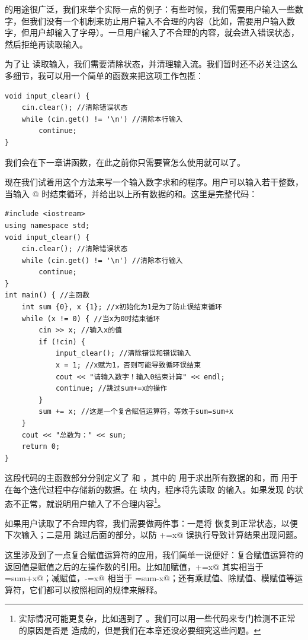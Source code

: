 \lstinline@continue@ 的用途很广泛，我们来举个实际一点的例子：有些时候，我们需要用户输入一些数字，但我们没有一个机制来防止用户输入不合理的内容（比如，需要用户输入数字，但用户却输入了字母）。一旦用户输入了不合理的内容，\lstinline@cin@ 就会进入错误状态，然后拒绝再读取输入。\par
为了让 \lstinline@cin@ 读取输入，我们需要清除状态，并清理输入流。我们暂时还不必关注这么多细节，我可以用一个简单的函数来把这项工作包揽：
\begin{lstlisting}
void input_clear() {
    cin.clear(); //清除错误状态
    while (cin.get() != '\n') //清除本行输入
        continue;
}
\end{lstlisting}
我们会在下一章讲函数，在此之前你只需要管怎么使用就可以了。\par
现在我们试着用这个方法来写一个输入数字求和的程序。用户可以输入若干整数，当输入 @ 时结束循环，并给出以上所有数据的和。这里是完整代码：
\begin{lstlisting}[caption=\texttt{sum.cpp},label=lst:SumWithContinue]
#include <iostream>
using namespace std;
void input_clear() {
    cin.clear(); //清除错误状态
    while (cin.get() != '\n') //清除本行输入
        continue;
}
int main() { //主函数
    int sum {0}, x {1}; //x初始化为1是为了防止误结束循环
    while (x != 0) { //当x为0时结束循环
        cin >> x; //输入x的值
        if (!cin) {
            input_clear(); //清除错误和错误输入
            x = 1; //x赋为1，否则可能导致循环误结束
            cout << "请输入数字！输入0结束计算" << endl;
            continue; //跳过sum+=x的操作
        }
        sum += x; //这是一个复合赋值运算符，等效于sum=sum+x
    }
    cout << "总数为：" << sum;
    return 0;
}
\end{lstlisting}
这段代码的主函数部分分别定义了 \lstinline@sum@ 和 \lstinline@x@，其中的 \lstinline@sum@ 用于求出所有数据的和，而 \lstinline@x@ 用于在每个迭代过程中存储新的数据。在 \lstinline@while@ 块内，程序将先读取 \lstinline@x@ 的输入。如果发现 \lstinline@cin@ 的状态不正常，就说明用户输入了不合理内容\footnote{实际情况可能更复杂，比如遇到了 \lstinline@EOF@。我们可以用一些代码来专门检测不正常的原因是否是 \lstinline@EOF@ 造成的，但是我们在本章还没必要细究这些问题。}。\par
如果用户读取了不合理内容，我们需要做两件事：一是将 \lstinline@cin@ 恢复到正常状态，以便下次输入；二是用 \lstinline@continue@ 跳过后面的部分，以防 \lstinline@sum+=x@ 误执行导致计算结果出现问题。\par
这里涉及到了一点复合赋值运算符的应用，我们简单一说便好：复合赋值运算符的返回值是赋值之后的左操作数的引用。比如加赋值，\lstinline@sum+=x@ 其实相当于 \lstinline@sum=sum+x@；减赋值，\lstinline@sum-=x@ 相当于 \lstinline@sum=sum-x@；还有乘赋值、除赋值、模赋值等运算符，它们都可以按照相同的规律来解释。\par
